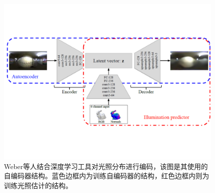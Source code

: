 \begin{figure}[!htbp]
    \centering
    \includegraphics[width=1.0\textwidth]{Img/auto-encoder.pdf}

    \caption[光照的自编码器结构]
    {Weber\cite{weber2018learning}等人结合深度学习工具对光照分布进行编码，该图是其使用的自编码器结构。蓝色边框内为训练自编码器的结构，红色边框内则为训练光照估计的结构。}
        
    \label{fig:auto-encoder}
\end{figure}